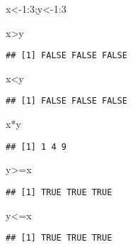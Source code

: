 \documentclass[
]{book}
\newenvironment{Shaded}{\begin{snugshade}}{\end{snugshade}}
\newcommand{\DecValTok}[1]{\textcolor[rgb]{0.00,0.00,0.81}{#1}}
\newcommand{\NormalTok}[1]{#1}
\newcommand{\OtherTok}[1]{\textcolor[rgb]{0.56,0.35,0.01}{#1}}
\newcommand{\SpecialCharTok}[1]{\textcolor[rgb]{0.00,0.00,0.00}{#1}}
\begin{document}
\begin{Shaded}
\begin{Highlighting}[]
\NormalTok{x}\OtherTok{\textless{}{-}}\DecValTok{1}\SpecialCharTok{:}\DecValTok{3}\NormalTok{;y}\OtherTok{\textless{}{-}}\DecValTok{1}\SpecialCharTok{:}\DecValTok{3}

\NormalTok{x}\SpecialCharTok{\textgreater{}}\NormalTok{y}
\end{Highlighting}
\end{Shaded}

\begin{verbatim}
## [1] FALSE FALSE FALSE
\end{verbatim}

\begin{Shaded}
\begin{Highlighting}[]
\NormalTok{x}\SpecialCharTok{\textless{}}\NormalTok{y}
\end{Highlighting}
\end{Shaded}

\begin{verbatim}
## [1] FALSE FALSE FALSE
\end{verbatim}

\begin{Shaded}
\begin{Highlighting}[]
\NormalTok{x}\SpecialCharTok{*}\NormalTok{y}
\end{Highlighting}
\end{Shaded}

\begin{verbatim}
## [1] 1 4 9
\end{verbatim}

\begin{Shaded}
\begin{Highlighting}[]
\NormalTok{y}\SpecialCharTok{\textgreater{}=}\NormalTok{x}
\end{Highlighting}
\end{Shaded}

\begin{verbatim}
## [1] TRUE TRUE TRUE
\end{verbatim}

\begin{Shaded}
\begin{Highlighting}[]
\NormalTok{y}\SpecialCharTok{\textless{}=}\NormalTok{x}
\end{Highlighting}
\end{Shaded}

\begin{verbatim}
## [1] TRUE TRUE TRUE
\end{verbatim}
\end{document}
